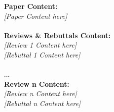 \begin{figure*}[h]
\begin{prompt}[title={Prompt \thetcbcounter: LLM-as-Meta-Reviewer: Template COT}]
\textbf{Paper Content:} \\
\textit{[Paper Content here]} \\ \\

\textbf{Reviews \& Rebuttals Content:} \\
\textit{[Review 1 Content here]} \\ 
\textit{[Rebuttal 1 Content here]} \\ \\
... \\
\textbf{Review n Content:} \\
\textit{[Review n Content here]} \\ 
\textit{[Rebuttal n Content here]} 
\end{prompt}
\end{figure*}


